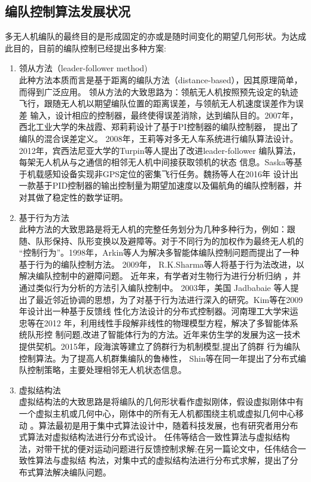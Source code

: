 \subsection{编队控制算法发展状况}
多无人机编队的最终目的是形成固定的亦或是随时间变化的期望几何形状。为达成此目的，目前的编队控制已经提出多种方案:
\begin{enumerate}
    \item 领从方法（leader-follower method)\\
        此种方法本质而言是基于距离的编队方法（distance-based），因其原理简单，而得到广泛应用。
        领从方法的大致思路为：领航无人机按照预先设定的轨迹飞行，跟随无人机以期望编队位置的距离误差，与领航无人机速度误差作为误差
        输入，设计相应的控制器，最终使得误差消除，达到编队目的。2007年，西北工业大学的朱战霞、郑莉莉设计了基于PI控制器的编队控制器，
        提出了编队的混合误差定义。\cite{ZhuZhanXia2007}
        2008年，王莉等对多无人车系统进行编队算法设计。\cite{WangLi2008}
        2012年，宾西法尼亚大学的Turpin等人提出了改进leader-follower 编队算法，每架无人机从与之通信的相邻无人机中间接获取领机的状态
        信息。\cite{Turpin2012Trajectory}Saska等基于机载感知设备实现非GPS定位的密集飞行任务。\cite{Saska2017System}魏扬等人在2016年
        设计出一款基于PID控制器的输出控制量为期望加速度以及偏航角的编队控制器，并对其做了稳定性的数学证明。\cite{WeiYang2016}
    \item 基于行为方法\\
        此种方法的大致思路是将无人机的完整任务划分为几种多种行为，例如：跟随、队形保持、队形变换以及避障等。对于不同行为的加权作为最终无人机的
        “控制行为”。1998年，Arkin等人为解决多智能体编队控制问题而提出了一种基于行为的编队控制方法。\cite{Balch1998Behavior} 2009年，
        R.K.Sharma等人将基于行为法改进，以解决编队控制中的避障问题。\cite{Sharma2009Collision} 近年来，有学者对生物行为进行分析归纳
        ，并通过类似行为分析的方法引入编队控制中。
        2003年，美国 Jadbabaie 等人提出了最近邻近协调的思想，为了对基于行为法进行深入的研究。\cite{Jadbabaie2003Coordination}Kim等在2009年设计出一种基于反馈线
        性化方法设计的分布式控制器。\cite{Kim2009}河南理工大学宋运忠等在2012 年，利用线性手段解非线性的物理模型方程，解决了多智能体系统队形控
        制问题,改进了智能体行为的方法。\cite{SongYunZhong2012}近年来仿生学的发展为这一技术提供契机。2015年，段海滨等建立了鸽群行为机制模型,提出了鸽群
        行为编队控制算法。\cite{DuanHaiBin2015}为了提高人机群集编队的鲁棒性，
        Shin等在同一年提出了分布式编队控制策略，主要处理相邻无人机状态信息。\cite{Jongho2015}
    \item 虚拟结构法\\
        虚拟结构法的大致思路是将编队的几何形状看作虚拟刚体，假设虚拟刚体中有一个虚拟主机或几何中心，刚体中的所有无人机都围绕主机或虚拟几何中心移动\cite{Lewis1997High}
        。算法最初是用于集中式算法设计中，随着科技发展，也有研究者用分布式算法对虚拟结构法进行分布式设计。
        任伟等结合一致性算法与虚拟结构法，对带干扰的便对运动问题进行反馈控制求解\cite{Ren2004Formation};在另一篇论文中，任伟结合一致性算法与虚拟结
        构法，对集中式的虚拟结构法进行分布式求解，提出了分布式算法解决编队问题。\cite{Ren2004Decentralized}
\end{enumerate}
